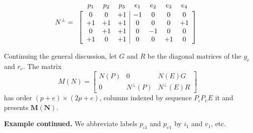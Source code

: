 \documentclass[12pt]{article}
\theoremstyle{definition}
\newcommand{\Is}{\ensuremath{\iota}}
\newcommand{\Vs}{\ensuremath{\upsilon}}
\newcommand{\ext}[1]{\ensuremath{\mathbf{#1}}}
\begin{document}
\[
N^\perp=
\begin{array}{c}
\begin{array}{ccccccc}
p_1 & p_2 & p_3 & e_1 & e_2 & e_3 & e_4 \\[-1em]
\hphantom{+1} & \hphantom{+1} &\hphantom{+1} &\hphantom{+1} &\hphantom{+1} &\hphantom{+1} &\hphantom{+1} 
\end{array} \\ 
\left[\begin{array}{ccc|cccc}
  0 &  0  &  +1 &  -1 &   0 &  0  & 0 \\
 +1 &  +1 &  +1 &   0 &   0 &  0  & +1\\
  0 &  +1 &  +1 &   0 &  -1 &  0  &  0\\
 +1 &   0 &  +1 &   0 &   0 & +1  &  0
	\end{array}\right]
  \end{array}
\]

Continuing the general discussion, let 
$G$ and $R$ be the diagonal matrices of the $g_e$ and $r_e$.
The matrix
\begin{equation}
\label{matrixM}
M(N)
=
\left[
	\begin{array}{ccc}
		N(P) & 0 & N(E)G \\
		0    & N^{\perp}(P) & N^{\perp}(E)R
	\end{array}
  \right]
\end{equation}
has order $(p+e)\times(2p+e)$, columns indexed by sequence
$P_{\Is}P_{\Vs}E$ it and presents $\ext{M}(\ext{N})$.

\textbf{Example continued.}
We abbreviate labels $p_{\Is 1}$ and $p_{\Vs 1}$ by $i_1$ and $v_1$, etc.

\end{document}
